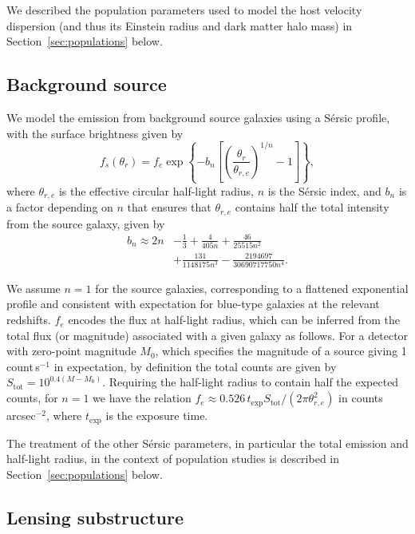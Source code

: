 \documentclass[twocolumn]{aastex63}
\begin{document}
We described the population parameters used to model the host velocity dispersion (and thus its Einstein radius and dark matter halo mass) in Section~\ref{sec:populations} below.

\subsection{Background source}
\label{sec:source}

We model the emission from background source galaxies using a S\'{e}rsic profile, with the surface brightness given by~\citep{1963BAAA....6...41S}
\begin{equation}
f_s(\theta_r)=f_{e} \exp \left\{-b_{n}\left[\left(\frac{\theta_r}{\theta_{r,e}}\right)^{1 / n}-1\right]\right\},
\end{equation}
where $\theta_{r,e}$ is the effective circular half-light radius, $n$ is the S\'{e}rsic index, and $b_n$ is a factor depending on $n$ that ensures that $\theta_{r,e}$ contains half the total intensity from the source galaxy, given by~\citep{1999A&A...352..447C}
\begin{align}
b_n \approx 2 n &- \frac{1}{3} + \frac{4}{405 n} + \frac{46}{25515 n^2} \nonumber \\ &+ \frac{131}{1148175 n^3} - \frac{2194697}{30690717750 n^4}. \nonumber
\end{align}

We assume $n=1$ for the source galaxies, corresponding to a flattened exponential profile and consistent with expectation for blue-type galaxies at the relevant redshifts. $f_{e}$ encodes the flux at half-light radius, which can be inferred from the total flux (or magnitude) associated with a given galaxy as follows. For a detector with zero-point magnitude $M_0$, which specifies the magnitude of a source giving 1 count\,s$^{-1}$ in expectation, by definition the total counts are given by $S_\mathrm{tot}=10^{0.4(M-M_0)}$. Requiring the half-light radius to contain half the expected counts, for $n=1$ we have the relation $f_{e} \approx 0.526\,t_\mathrm{exp}S_\mathrm{tot} /(2\pi \theta_{r,e}^2)$ in counts\,arcsec$^{-2}$, where $t_\mathrm{exp}$ is the exposure time.

The treatment of the other S\'{e}rsic parameters, in particular the total emission and half-light radius, in the context of population studies is described in Section~\ref{sec:populations} below.

\subsection{Lensing substructure}
\end{document}
